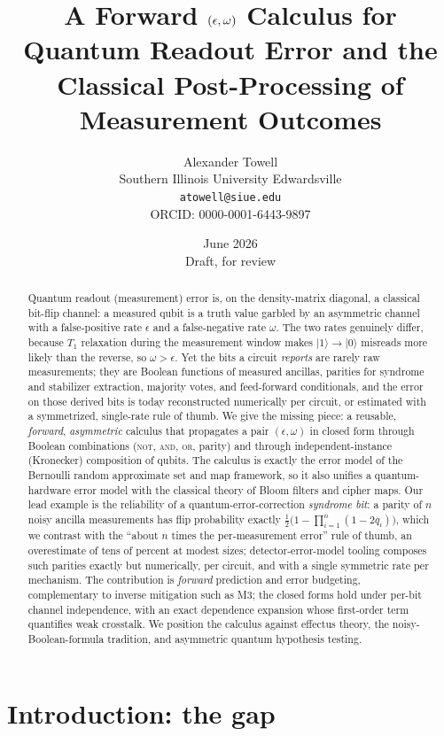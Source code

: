 \documentclass[12pt]{article}
\title{\bf A Forward $(\eps,\omega)$ Calculus for Quantum Readout Error and
the Classical Post-Processing of Measurement Outcomes}
\author{Alexander Towell\\
  Southern Illinois University Edwardsville\\
  \texttt{atowell@siue.edu}\\
  ORCID: 0000-0001-6443-9897}
\date{June 2026\\[4pt]\small Draft, for review}
\numberwithin{equation}{section}
\theoremstyle{plain}
\theoremstyle{definition}
\theoremstyle{remark}
\newcommand{\eps}{\epsilon}
\newcommand{\ket}[1]{\lvert #1 \rangle}
\begin{document}
\maketitle

\begin{abstract}
Quantum readout (measurement) error is, on the density-matrix diagonal, a
classical bit-flip channel: a measured qubit is a truth value
garbled by an asymmetric channel with a false-positive rate $\eps$ and a
false-negative rate $\omega$. The two rates genuinely differ, because $T_1$
relaxation during the measurement window makes $\ket{1}\!\to\!\ket{0}$ misreads
more likely than the reverse, so $\omega > \eps$. Yet the bits a circuit
\emph{reports} are rarely raw measurements; they are Boolean functions of
measured ancillas, parities for syndrome and stabilizer extraction, majority
votes, and feed-forward conditionals, and the error on those derived bits is
today reconstructed numerically per circuit, or estimated with a symmetrized,
single-rate rule of thumb. We give the missing piece: a reusable,
\emph{forward}, \emph{asymmetric} calculus that propagates a pair $(\eps,\omega)$
in closed form through Boolean combinations (\textsc{not}, \textsc{and},
\textsc{or}, parity) and through independent-instance (Kronecker) composition of
qubits. The calculus is exactly the error model of the Bernoulli random
approximate set and map framework, so it also unifies a quantum-hardware error
model with the classical theory of Bloom filters and cipher maps. Our lead
example is the reliability of a quantum-error-correction \emph{syndrome bit}: a
parity of $n$ noisy ancilla measurements has flip probability exactly
$\tfrac12\bigl(1 - \prod_{i=1}^{n}(1-2q_i)\bigr)$, which we contrast with the
``about $n$ times the per-measurement error'' rule of thumb, an overestimate of
tens of percent at modest sizes; detector-error-model tooling composes such
parities exactly but numerically, per circuit, and with a single symmetric rate
per mechanism. The contribution is \emph{forward} prediction
and error budgeting, complementary to inverse mitigation such as M3; the closed
forms hold under per-bit channel independence, with an exact dependence
expansion whose first-order term quantifies weak crosstalk. We position the
calculus against effectus theory, the noisy-Boolean-formula tradition, and
asymmetric quantum hypothesis testing.
\end{abstract}

\section{Introduction: the gap}
\label{sec:intro}
\end{document}
